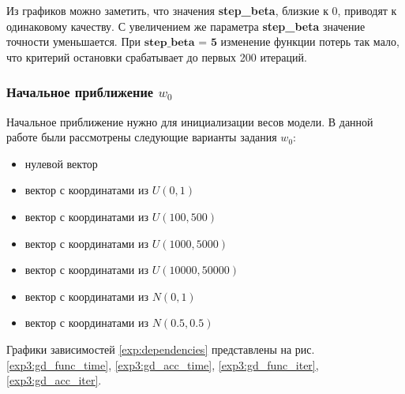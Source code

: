 \documentclass[a4paper, 11pt]{article}
\begin{document}
            Из графиков можно заметить, что значения \textbf{step\_beta}, близкие к 0, приводят к одинаковому качеству. С увеличением же параметра \textbf{step\_beta} значение точности уменьшается. При $\textbf{step\_beta = 5}$ изменение функции потерь так мало, что критерий остановки срабатывает до первых 200 итераций.
            
            \subsubsection{Начальное приближение $w_0$}
                Начальное приближение нужно для инициализации весов модели. В данной работе были рассмотрены следующие варианты задания $w_0$:
                \begin{itemize}
                    \item нулевой вектор
                    \item вектор с координатами из $U(0, 1)$
                    \item вектор с координатами из $U(100, 500)$
                    \item вектор с координатами из $U(1000, 5000)$
                    \item вектор с координатами из $U(10000, 50000)$
                    \item вектор с координатами из $N(0, 1)$
                    \item вектор с координатами из $N(0.5, 0.5)$
                \end{itemize}
                Графики зависимостей \ref{exp:dependencies} представлены на рис.  \ref{exp3:gd_func_time}, \ref{exp3:gd_acc_time}, \ref{exp3:gd_func_iter}, \ref{exp3:gd_acc_iter}.
\end{document}
